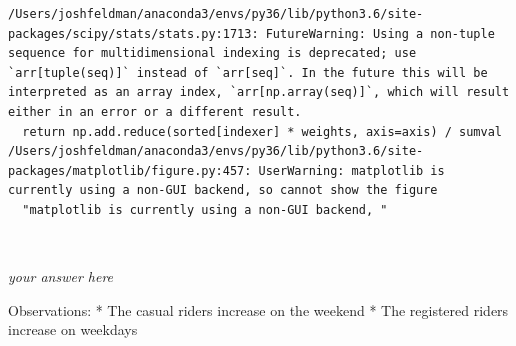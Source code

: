 \documentclass[11pt]{article}
\begin{document}
    \begin{Verbatim}[commandchars=\\\{\}]
/Users/joshfeldman/anaconda3/envs/py36/lib/python3.6/site-packages/scipy/stats/stats.py:1713: FutureWarning: Using a non-tuple sequence for multidimensional indexing is deprecated; use `arr[tuple(seq)]` instead of `arr[seq]`. In the future this will be interpreted as an array index, `arr[np.array(seq)]`, which will result either in an error or a different result.
  return np.add.reduce(sorted[indexer] * weights, axis=axis) / sumval
/Users/joshfeldman/anaconda3/envs/py36/lib/python3.6/site-packages/matplotlib/figure.py:457: UserWarning: matplotlib is currently using a non-GUI backend, so cannot show the figure
  "matplotlib is currently using a non-GUI backend, "

    \end{Verbatim}

    \begin{center}
    \end{center}
    { \hspace*{\fill} \\}
    
    \emph{your answer here}

Observations: * The casual riders increase on the weekend * The
registered riders increase on weekdays
\end{document}
